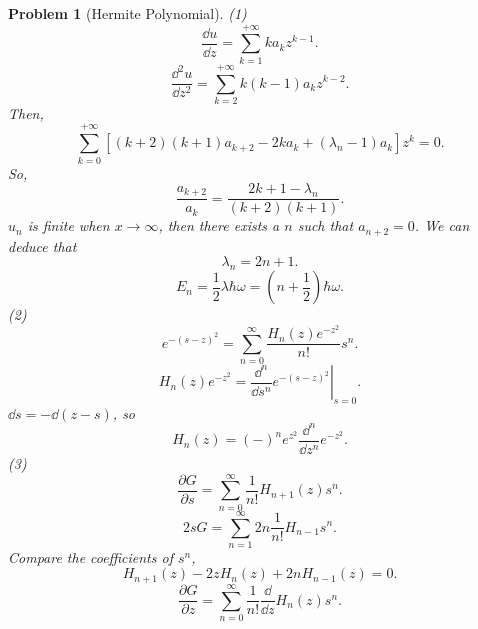 \documentclass{article}
\theoremstyle{1}
\newtheorem{problem}{Problem}
\newcommand{\pa}{\partial}
\begin{document}
\begin{problem}[Hermite Polynomial]
    (1) \begin{equation}
        \frac{\dd{u}}{\dd{z}}=\sum_{k=1}^{+\infty}ka_kz^{k-1}.
    \end{equation}
    \begin{equation}
        \frac{\dd^2 u}{\dd{z}^2}=\sum_{k=2}^{+\infty}k(k-1)a_kz^{k-2}.
    \end{equation}
    Then, 
    \begin{equation}
        \sum_{k=0}^{+\infty}\left[(k+2)(k+1)a_{k+2}-2ka_k+(\lambda_n-1)a_k\right]z^k=0.
    \end{equation}
    So, 
    \begin{equation}
        \frac{a_{k+2}}{a_k}=\frac{2k+1-\lambda_n}{(k+2)(k+1)}.
    \end{equation}
    $u_n$ is finite when $x\rightarrow\infty$, then there exists a $n$ such that $a_{n+2}=0$. We can deduce that
    \begin{equation}
        \boxed{\lambda_n=2n+1.}
    \end{equation}
    \begin{equation}
        E_n=\frac{1}{2}\lambda \hbar \omega=\left(n+\frac{1}{2}\right)\hbar\omega.
    \end{equation}
    (2) \begin{equation}
        e^{-(s-z)^2}=\sum_{n=0}^{\infty}\frac{H_n(z)e^{-z^2}}{n!}s^n.
    \end{equation}
    \begin{equation}
        H_n(z)e^{-z^2}=\left.\frac{\dd^n}{\dd{s}^n}e^{-(s-z)^2}\right|_{s=0}.
    \end{equation}
    $\dd{s}=-\dd{(z-s)}$, so 
    \begin{equation}
        \boxed{H_n(z)=(-)^ne^{z^2}\frac{\dd ^n}{\dd{z}^n}e^{-z^2}.}
    \end{equation}
    (3) \begin{equation}
        \frac{\pa G}{\pa s}=\sum_{n=0}^{\infty}\frac{1}{n!}H_{n+1}(z)s^n.
    \end{equation}
    \begin{equation}
        2sG=\sum_{n=1}^{\infty}2n\frac{1}{n!}H_{n-1}s^n.
    \end{equation}
    Compare the coefficients of $s^n$,
    \begin{equation}
        \boxed{H_{n+1}(z)-2zH_n(z)+2nH_{n-1}(z)=0.}
    \end{equation}
    \begin{equation}
        \frac{\pa G}{\pa z}=\sum_{n=0}^{\infty}\frac{1}{n!}\frac{\dd}{\dd z}H_n(z)s^n.

\end{equation}
\end{problem}
\end{document}
